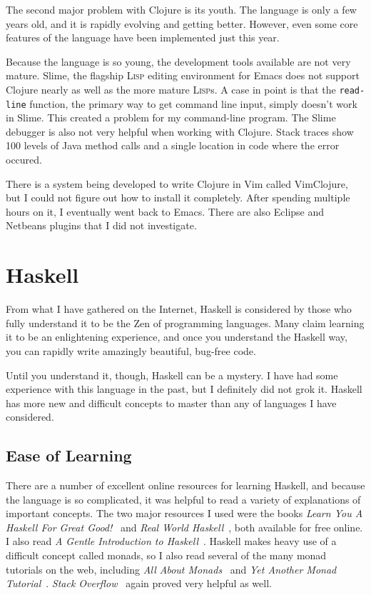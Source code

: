 \documentclass{article}
\begin{document}
The second major problem with Clojure is its youth.  The language is only
a few years old, and it is rapidly evolving and getting better.  However, even
some core features of the language have been implemented just this year.

Because the language is so young, the development tools available are not very
mature.  Slime, the flagship \textsc{Lisp} editing environment for Emacs does
not support Clojure nearly as well as the more mature \textsc{Lisp}s.  A case in
point is that the \texttt{read-line} function, the primary way to get command
line input, simply doesn't work in Slime.  This created a problem for my
command-line program.  The Slime debugger is also not very helpful when working
with Clojure.  Stack traces show 100 levels of Java method calls and a single
location in code where the error occured.

There is a system being developed to write Clojure in Vim called VimClojure, but
I could not figure out how to install it completely.  After spending multiple
hours on it, I eventually went back to Emacs.  There are also Eclipse and
Netbeans plugins that I did not investigate.

\section{Haskell}

From what I have gathered on the Internet, Haskell is considered by those who
fully understand it to be the Zen of programming languages.  Many claim learning
it to be an enlightening experience, and once you understand the Haskell way,
you can rapidly write amazingly beautiful, bug-free code.

Until you understand it, though, Haskell can be a mystery.  I have had some
experience with this language in the past, but I definitely did not grok it.
Haskell has more new and difficult concepts to master than any of languages I
have considered.

\subsection{Ease of Learning}

There are a number of excellent online resources for learning Haskell, and
because the language is so complicated, it was helpful to read a variety of
explanations of important concepts.  The two major resources I used were the
books \emph{Learn You A Haskell For Great Good!}~\cite{learnyouahaskell} and
\emph{Real World Haskell}~\cite{realworldhaskell}, both available for free
online.  I also read \emph{A Gentle Introduction to
Haskell}~\cite{gentleintroduction}.  Haskell makes heavy use of a difficult
concept called monads, so I also read several of the many monad tutorials on the
web, including \emph{All About Monads}~\cite{allaboutmonads} and \emph{Yet
Another Monad Tutorial}~\cite{yamt}.  \emph{Stack Overflow}~\cite{stackoverflow}
again proved very helpful as well.
\end{document}
